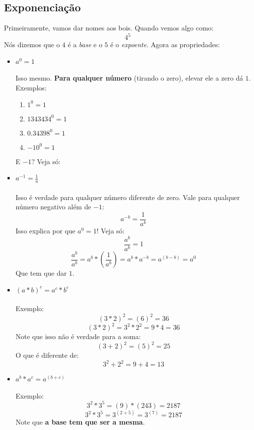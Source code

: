 \documentclass[11pt]{article}
\begin{document}
\subsection{Exponenciação}
Primeiramente, vamos dar nomes aos bois. Quando vemos algo como:
$$4^5$$
Nós dizemos que o $4$ é a \textit{base} e o $5$ é o \textit{expoente}. Agora
as propriedades:
\begin{itemize}
	\item $a^0 = 1$
	\paragraph{}
	Isso mesmo. \textbf{Para qualquer número} (tirando o zero), elevar ele
	a zero dá $1$. Exemplos:
	\begin{enumerate}
		\item $1^0 = 1$
		\item $1343434^0 = 1$
		\item $0.34398^0 = 1$
		\item ${-10}^0 = 1$
	\end{enumerate}
	E $-1$? Veja só:

	\item $a^{-1} = \frac{1}{a}$
	\paragraph{}
	Isso é verdade para qualquer número diferente de zero. Vale para qualquer
	número negativo além de $-1$:
	$$a^{-b} = \frac{1}{a^{b}}$$
	Isso explica por que $a^0 = 1$! Veja só:
	$$\frac{a^b}{a^b} = 1$$
	$$\frac{a^b}{a^b} = a^b*(\frac{1}{a^b}) = a^b*a^{-b} = a^{(b-b)} = a^0$$
	Que tem que dar $1$.

	\item ${(a*b)}^c = a^c*b^c$
	\paragraph{}
	Exemplo:
	$${(3*2)}^2 = {(6)}^2 = 36$$
	$${(3*2)}^2 = 3^2*2^2 = 9*4 = 36$$
	Note que isso não é verdade para a soma:
	$${(3+2)}^2 = {(5)}^2 = 25$$
	O que é diferente de:
	$$3^2 + 2^2 = 9 + 4 = 13$$

	\item $a^b*a^c = a^{(b + c)}$
	\paragraph{}
	Exemplo:
	$$3^2*3^5 = (9)*(243) = 2187$$	
	$$3^2*3^5 = 3^{(2 + 5)} = 3^{(7)} = 2187$$	
	Note que \textbf{a base tem que ser a mesma}.


\end{itemize}
\end{document}
